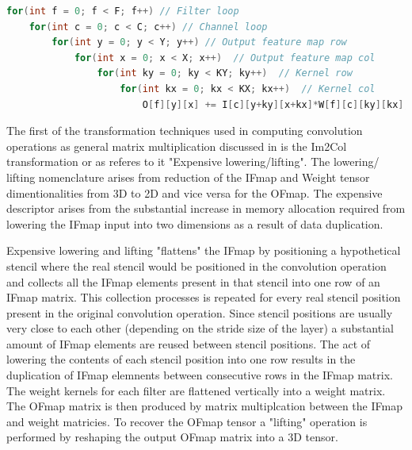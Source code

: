 \begin{minipage}{\linewidth}
    \begin{lstlisting}[language=C, caption=Convolution implemented as nested loops, label={lst:conv_loop}]
for(int f = 0; f < F; f++) // Filter loop
    for(int c = 0; c < C; c++) // Channel loop
        for(int y = 0; y < Y; y++) // Output feature map row
            for(int x = 0; x < X; x++)  // Output feature map col
                for(int ky = 0; ky < KY; ky++)  // Kernel row
                    for(int kx = 0; kx < KX; kx++)  // Kernel col
                        O[f][y][x] += I[c][y+ky][x+kx]*W[f][c][ky][kx];
    \end{lstlisting}
\end{minipage}

The first of the transformation techniques used in computing convolution
operations as general matrix multiplication discussed in \cite{cafe_con_troll}
is the Im2Col transformation or as \cite{cafe_con_troll} referes to it
"Expensive lowering/lifting". The lowering/ lifting nomenclature arises from
reduction of the IFmap and Weight tensor dimentionalities from 3D to 2D and vice
versa for the OFmap. The expensive descriptor arises from the substantial
increase in memory allocation required from lowering the IFmap input into two
dimensions as a result of data duplication. 

Expensive lowering and lifting "flattens" the IFmap by positioning a
hypothetical stencil where the real stencil would be positioned in the
convolution operation and collects all the IFmap elements present in that
stencil into one row of an IFmap matrix. This collection processes is repeated
for every real stencil position present in the original convolution operation.
Since stencil positions are usually very close to each other (depending on the
stride size of the layer) a substantial amount of IFmap elements are reused
between stencil positions. The act of lowering the contents of each stencil
position into one row results in the duplication of IFmap elemnents between
consecutive rows in the IFmap matrix.  
The weight kernels for each filter are flattened vertically into a weight
matrix. The OFmap matrix is then produced by matrix multiplcation between the
IFmap and weight matricies. To recover the OFmap tensor a "lifting" operation is
performed by reshaping the output OFmap matrix into a 3D tensor.  

